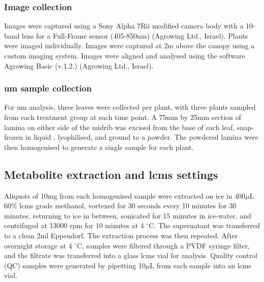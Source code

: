 \subsubsection{Image collection}
Images were captured using a Sony Alpha 7Rii modified camera body with a 10-band lens for a Full-Frame sensor (405-850nm) (Agrowing Ltd., Israel). Plants were imaged individually. Images were captured at 2m above the canopy using a custom imaging system. Images were aligned and analysed using the software Agrowing Basic (v.1.2.) (Agrowing Ltd., Israel). 

\subsubsection{\Acl{um} sample collection}
For \ac{um} analysis, three leaves were collected per plant, with three plants sampled from each treatment group at each time point. A 75mm by 25mm section of lamina on either side of the midrib was excised from the base of each leaf, snap-frozen in liquid , lyophilised, and ground to a powder. The powdered lamina were then homogenised to generate a single sample for each plant. 



\subsection{Metabolite extraction and \ac{lcms} settings}
Aliquots of 10mg from each homogenised sample were extracted on ice in 400\(\mu\)L 60\% \ac{lcms} grade methanol, vortexed for 30 seconds every 10 minutes for 30 minutes, returning to ice in between, sonicated for 15 minutes in ice-water, and centrifuged at 13000 \ac{rpm} for 10 minutes at 4 $^{\circ}$C. The supernatant was transferred to a clean 2ml Eppendorf. The extraction process was then repeated. After overnight storage at 4 $^{\circ}$C, samples were filtered through a PVDF syringe filter, and the filtrate was transferred into a glass \ac{lcms} vial for analysis. Quality control (QC) samples were generated by pipetting 10\(\mu\)L from each sample into an \ac{lcms} vial. 

